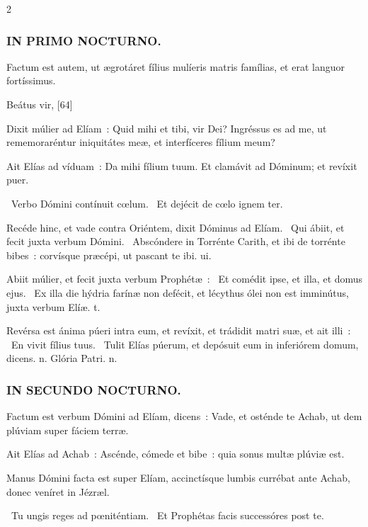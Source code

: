 \documentclass[9pt,twoside]{extarticle}
\begin{document}
\begin{multicols}{2}
{\subsubsection*{\center \textsc{IN PRIMO NOCTURNO.}}
\begin{tightlist}{}
\item {} Factum est autem, ut ægrotáret fílius mulíeris matris famílias, et erat languor fortíssimus.
\item {} Beátus vir,  [64]
\item {} Dixit múlier ad Elíam~: Quid mihi et tibi, vir Dei? Ingréssus es ad me, ut rememoraréntur iniquitátes meæ, et interfíceres fílium meum?
\item {} Ait Elías ad víduam~: Da mihi fílium tuum. Et clamávit ad Dóminum; et revíxit puer.
\item {}~Verbo Dómini contínuit cœlum. ~Et dejécit de cœlo ignem ter.
\item {}
\item {} Recéde hinc, et vade contra Oriéntem, dixit Dóminus ad Elíam. \textred{*}~Qui ábiit, et fecit juxta verbum Dómini. ~Abscóndere in Torrénte Carith, et ibi de torrénte bibes~: corvísque præcépi, ut pascant te ibi. ui.
\item {} Abiit múlier, et fecit juxta verbum Prophétæ~: \textred{*}~Et comédit ipse, et illa, et domus ejus. ~Ex illa die hýdria farínæ non defécit, et lécythus ólei non est imminútus, juxta verbum Elíæ. t.
\item {} Revérsa est ánima púeri intra eum, et revíxit, et trádidit matri suæ, et ait illi~: \textred{*}~En vivit fílius tuus. ~Tulit Elías púerum, et depósuit eum in inferiórem domum, dicens. n. Glória Patri. n.
\end{tightlist}

\subsubsection*{\center \textsc{IN SECUNDO NOCTURNO.}}
\begin{tightlist}{}
\item {} Factum est verbum Dómini ad Elíam, dicens~: Vade, et osténde te Achab, ut dem plúviam super fáciem terræ.
\item {} Ait Elías ad Achab~: Ascénde, cómede et bibe~: quia sonus multæ plúviæ est.
\item {} Manus Dómini facta est super Elíam, accinctísque lumbis currébat ante Achab, donec veníret in Jézræl.
\item {}~Tu ungis reges ad pœniténtiam. ~Et Prophétas facis successóres post te.
\end{tightlist}

}
\end{multicols}
\end{document}

